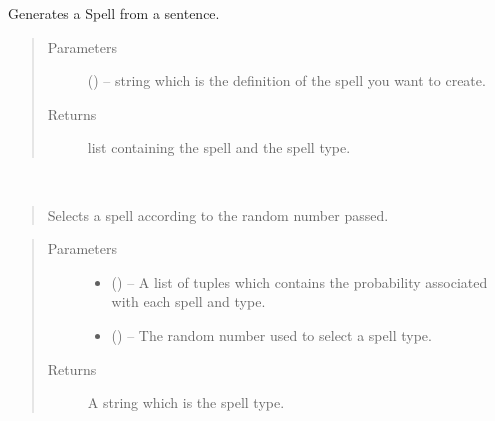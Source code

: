 \documentclass[letterpaper,10pt,english]{sphinxmanual}
\begin{document}

\begin{fulllineitems}
\label{code:hp_spells.generateSpell}
Generates a Spell from a sentence.
\begin{quote}\begin{description}
\item[{Parameters}] \leavevmode
{} () -- string which is the definition of the spell you want to create.

\item[{Returns}] \leavevmode
list containing the spell and the spell type.

\end{description}\end{quote}

\end{fulllineitems}


\begin{fulllineitems}
\label{code:hp_spells.getSpellType}~\begin{quote}

Selects a spell according to the random number passed.
\end{quote}
\begin{quote}\begin{description}
\item[{Parameters}] \leavevmode\begin{itemize}
\item {} 
 (\sphinxstyleliteralemphasis{}\sphinxstyleliteralemphasis{{[}}\sphinxstyleliteralemphasis{}\sphinxstyleliteralemphasis{(}\sphinxstyleliteralemphasis{,}\sphinxstyleliteralemphasis{,}\sphinxstyleliteralemphasis{)}\sphinxstyleliteralemphasis{{]}}\sphinxstyleliteralemphasis{}) -- A list of tuples which contains the probability associated with each spell and type.

\item {} 
 () -- The random number used to select a spell type.

\end{itemize}

\item[{Returns}] \leavevmode
A string which is the spell type.

\end{description}\end{quote}

\end{fulllineitems}
\end{document}
